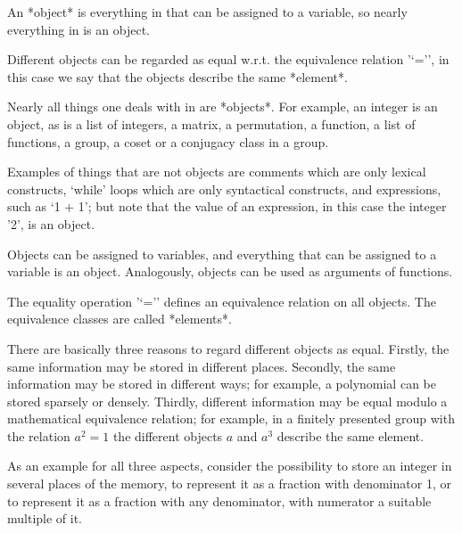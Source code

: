 

An *object* is everything in {\GAP} that can be assigned to a variable,
so nearly everything in {\GAP} is an object.

Different objects can be regarded as equal w.r.t. the equivalence
relation '`='',
in this case we say that the objects describe the same *element*.


Nearly all things one deals with in {\GAP} are *objects*.
For example, an integer is an object, as is a list of integers, a matrix,
a permutation, a function, a list of functions, a group,
a coset or a conjugacy class in a group.

Examples of things that are not objects are
comments which are only lexical constructs,
`while' loops which are only syntactical constructs,
and expressions, such as `1 + 1';
but note that the value of an expression, in this case the integer '2',
is an object.

Objects can be assigned to variables,
and everything that can be assigned to a variable is an object.
Analogously, objects can be used as arguments of functions.


The equality operation '`='' defines an equivalence relation on all
{\GAP} objects.
The equivalence classes are called *elements*.

There are basically three reasons to regard different objects as equal.
Firstly, the same information may be stored in different places.
Secondly, the same information may be stored in different ways;
for example, a polynomial can be stored sparsely or densely.
Thirdly, different information may be equal modulo a mathematical
equivalence relation;
for example, in a finitely presented group with the relation $a^2 = 1$
the different objects $a$ and $a^3$ describe the same element.

As an example for all three aspects, consider the possibility to store
an integer in several places of the memory,
to represent it as a fraction with denominator 1,
or to represent it as a fraction with any denominator, with numerator
a suitable multiple of it.

